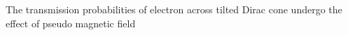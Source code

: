     The transmission probabilities of electron across tilted Dirac cone undergo the effect of pseudo magnetic field